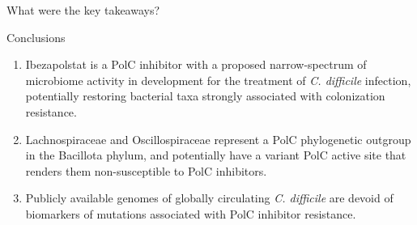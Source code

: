 
\begin{frame}[plain]
  \centering
  \hspace*{-1cm}%
  \vspace*{-4cm}%
  \begin{minipage}{0.8\textwidth}
    \centering
    {\Huge What were the key takeaways?}
  \end{minipage}
  \vfill
\end{frame}

\begin{frame}{Conclusions}

    \begin{enumerate}%
        \item Ibezapolstat is a PolC inhibitor with a proposed narrow-spectrum of microbiome activity in development for the treatment of \textit{C. difficile} infection, potentially restoring bacterial taxa strongly associated with colonization resistance. 
        \item Lachnospiraceae and Oscillospiraceae represent a PolC phylogenetic outgroup in the Bacillota phylum, and potentially have a variant PolC active site that renders them non-susceptible to PolC inhibitors. 
        \item Publicly available genomes of globally circulating \textit{C. difficile} are devoid of biomarkers of mutations associated with PolC inhibitor resistance. 
    \end{enumerate}
\end{frame}


